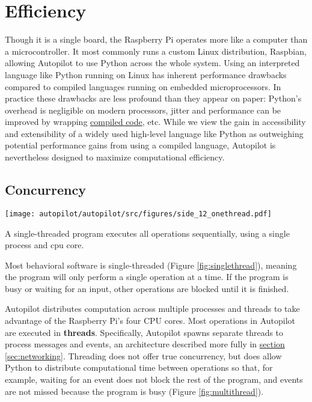 \section{Efficiency}
\label{sec:efficiency}

Though it is a single board, the Raspberry Pi operates more like a computer than a microcontroller. It most commonly runs a custom Linux distribution, Raspbian, allowing Autopilot to use Python across the whole system. Using an interpreted language like Python running on Linux has inherent performance drawbacks compared to compiled languages running on embedded microprocessors. In practice these drawbacks are less profound than they appear on paper: Python's overhead is negligible on modern processors, jitter and performance can be improved by wrapping \hyperref[sec:lowlevel]{compiled code}, etc. While we view the gain in accessibility and extensibility of a widely used high-level language like Python as outweighing potential performance gains from using a compiled language, Autopilot is nevertheless designed to maximize computational efficiency.

\subsection{Concurrency}

\begin{marginfigure}[2cm]
\texttt{[image: autopilot/autopilot/src/figures/side\_12\_onethread.pdf]}
\caption{A single-threaded program executes all operations sequentially, using a single process and cpu core.}
\label{fig:singlethread}
\end{marginfigure}

Most behavioral software is single-threaded (Figure \ref{fig:singlethread}), meaning the program will only perform a single operation at a time. If the program is busy or waiting for an input, other operations are blocked until it is finished.

Autopilot distributes computation across multiple processes and threads to take advantage of the Raspberry Pi's four CPU cores. Most operations in Autopilot are executed in \textbf{threads}. Specifically, Autopilot spawns separate threads to process messages and events, an architecture described more fully in \hyperref[sec:networking]{section \ref*{sec:networking}}. Threading does not offer true concurrency, but does allow Python to distribute computational time between operations so that, for example, waiting for an event does not block the rest of the program, and events are not missed because the program is busy (Figure \ref{fig:multithread}).

